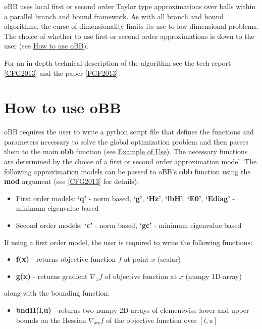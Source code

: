 \documentclass[letterpaper,11pt,openany,oneside]{sphinxmanual}
\begin{document}
oBB uses local first or second order Taylor type approximations over balls within a parallel branch and bound framework. As with all branch and bound algorithms, the curse of dimensionality limits its use to low dimensional problems. The choice of whether to use first or second order approximations is down to the user  (see {\hyperref[userguide:how-to-use-obb]{How to use oBB}}).

For an in-depth technical description of the algorithm see the tech-report {\hyperref[userguide:cfg2013]{{[}CFG2013{]}}} and the paper {\hyperref[userguide:fgf2013]{{[}FGF2013{]}}}.


\section{How to use oBB}
\label{userguide:how-to-use-obb}
oBB requires the user to write a python script file that defines the functions and parameters necessary to solve the global optimization problem and then passes them to the main \textbf{obb} function (see {\hyperref[userguide:example-of-use]{Example of Use}}). The necessary functions are determined by the choice of a first or second order approximation model. The following approximation models can be passed to oBB's \textbf{obb} function using the \textbf{mod} argument (see {\hyperref[userguide:cfg2013]{{[}CFG2013{]}}} for details):
\begin{itemize}
\item {} 
First order models: \textbf{`q'} - norm based,  \textbf{`g'}, \textbf{`Hz'}, \textbf{`lbH'}, \textbf{`E0'}, \textbf{`Ediag'} - minimum eigenvalue based

\item {} 
Second order models: \textbf{`c'} - norm based, \textbf{`gc'} - minimum eigenvalue based

\end{itemize}

If using a first order model, the user is required to write the following functions:
\begin{itemize}
\item {} 
\textbf{f(x)} - returns objective function \(f\) at point \(x\) (scalar)

\item {} 
\textbf{g(x)} - returns gradient \(\nabla_x f\) of objective function at \(x\) (numpy 1D-array)

\end{itemize}

along with the bounding function:
\begin{itemize}
\item {} 
\textbf{bndH(l,u)} - returns two numpy 2D-arrays of elementwise lower and upper bounds on the Hessian \(\nabla_{xx} f\) of the objective function over \([l,u]\)

\end{itemize}
\end{document}
